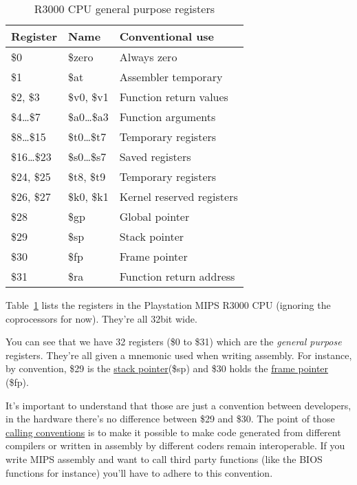 \documentclass[a4paper]{article}
\begin{document}
\begin{table}[ht]
  \centering

  \begin{tabular}{ l | l | l }
    Register         & Name             & Conventional use          \\
    \hline
    \$0              & \$zero           & Always zero               \\
    \$1              & \$at             & Assembler temporary       \\
    \$2, \$3         & \$v0, \$v1       & Function return values    \\
    \$4\dots{}\$7    & \$a0\dots{}\$a3  & Function arguments        \\
    \$8\dots{}\$15   & \$t0\dots{}\$t7  & Temporary registers       \\
    \$16\dots{}\$23  & \$s0\dots{}\$s7  & Saved registers           \\
    \$24, \$25       & \$t8, \$t9       & Temporary registers       \\
    \$26, \$27       & \$k0, \$k1       & Kernel reserved registers \\
    \$28             & \$gp             & Global pointer            \\
    \$29             & \$sp             & Stack pointer             \\
    \$30             & \$fp             & Frame pointer             \\
    \$31             & \$ra             & Function return address   \\
  \end{tabular}

  \caption{R3000 CPU general purpose registers}
  \label{tab:cpuregs}
\end{table}

Table~\ref{tab:cpuregs} lists the registers in the Playstation MIPS
R3000 CPU (ignoring the coprocessors for now). They're all 32bit
wide.

You can see that we have 32 registers (\$0 to \$31) which are the
\emph{general purpose} registers. They're all given a mnemonic used
when writing assembly. For instance, by convention, \$29 is the
\href{https://en.wikipedia.org/wiki/Call_stack}{stack pointer}(\$sp)
and \$30 holds the
\href{https://en.wikipedia.org/wiki/Call_stack#FRAME-POINTER}{frame
  pointer} (\$fp).

It's important to understand that those are just a convention between
developers, in the hardware there's no difference between \$29 and
\$30. The point of those
\href{https://en.wikipedia.org/wiki/Calling_convention}{calling
  conventions} is to make it possible to make code generated from
different compilers or written in assembly by different coders remain
interoperable. If you write MIPS assembly and want to call third party
functions (like the BIOS functions for instance) you'll have to adhere
to this convention.
\end{document}
